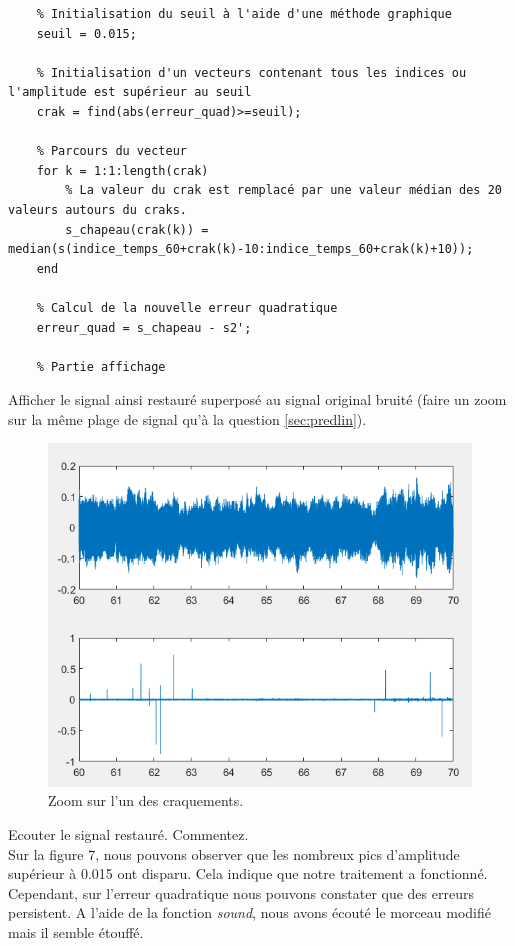 \documentclass{article}
\begin{document}
\begin{verbatim}
    % Initialisation du seuil à l'aide d'une méthode graphique
    seuil = 0.015;
    
    % Initialisation d'un vecteurs contenant tous les indices ou l'amplitude est supérieur au seuil
    crak = find(abs(erreur_quad)>=seuil);
    
    % Parcours du vecteur 
    for k = 1:1:length(crak)
        % La valeur du crak est remplacé par une valeur médian des 20 valeurs autours du craks.
        s_chapeau(crak(k)) = median(s(indice_temps_60+crak(k)-10:indice_temps_60+crak(k)+10));
    end
    
    % Calcul de la nouvelle erreur quadratique 
    erreur_quad = s_chapeau - s2';
    
    % Partie affichage 
\end{verbatim}

Afficher le signal ainsi restauré  superposé au signal original bruité (faire un zoom sur la même plage de signal qu'à la question \ref{sec:predlin}).\\

\begin{figure}[!h]
    \centering
    \includegraphics[width=1\textwidth]{images/signalcraquement.png}
    \caption{Zoom sur l'un des craquements.}
    \label{fig-binaire}
\end{figure}


Ecouter le signal restauré. Commentez.\\
\newline
Sur la figure 7, nous pouvons observer que les nombreux pics d'amplitude supérieur à 0.015 ont disparu. Cela indique que notre traitement a fonctionné. Cependant, sur l'erreur quadratique nous pouvons constater que des erreurs persistent. A l'aide de la fonction \textit{sound}, nous avons écouté le morceau modifié mais il semble étouffé. 
\clearpage
\end{document}

